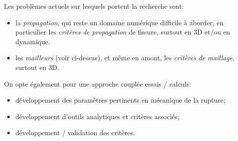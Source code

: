 \medskip
Les problèmes actuels sur lesquels portent la recherche sont:
\begin{itemize}
  \item la \emph{propagation}, qui reste un domaine numérique difficile à aborder, en
	particulier les \emph{critères de propagation} de fissure, surtout en 3D et/ou en dynamique.
  \item les \emph{mailleurs} (voir ci-dessus), et même en amont, les \emph{critères de maillage},
	surtout en 3D.	
\end{itemize}
\medskipvm
On opte également pour une approche couplée essais / calculs:
\begin{itemize}
  \item développement des paramètres pertinents en mécanique de la rupture;
  \item développement d'outils analytiques et critères associés;
  \item développement / validation des critères.
\end{itemize}

\medskip
